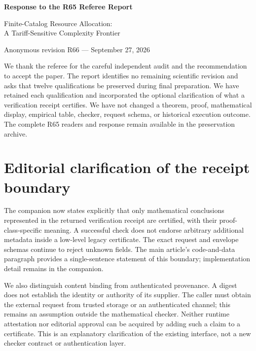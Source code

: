 \documentclass[11pt,letterpaper]{article}
\begin{document}
\begin{center}
{\Large\bfseries Response to the R65 Referee Report}\par\medskip
Finite-Catalog Resource Allocation:\\ A Tariff-Sensitive Complexity Frontier\par\medskip
Anonymous revision R66 --- September 27, 2026
\end{center}
We thank the referee for the careful independent audit and the recommendation to accept the paper. The report identifies no remaining scientific revision and asks that twelve qualifications be preserved during final preparation. We have retained each qualification and incorporated the optional clarification of what a verification receipt certifies. We have not changed a theorem, proof, mathematical display, empirical table, checker, request schema, or historical execution outcome. The complete R65 readers and response remain available in the preservation archive.

\section*{Editorial clarification of the receipt boundary}
The companion now states explicitly that only mathematical conclusions represented in the returned verification receipt are certified, with their proof-class-specific meaning. A successful check does not endorse arbitrary additional metadata inside a low-level legacy certificate. The exact request and envelope schemas continue to reject unknown fields. The main article's code-and-data paragraph provides a single-sentence statement of this boundary; implementation detail remains in the companion.

We also distinguish content binding from authenticated provenance. A digest does not establish the identity or authority of its supplier. The caller must obtain the external request from trusted storage or an authenticated channel; this remains an assumption outside the mathematical checker. Neither runtime attestation nor editorial approval can be acquired by adding such a claim to a certificate. This is an explanatory clarification of the existing interface, not a new checker contract or authentication layer.
\end{document}
